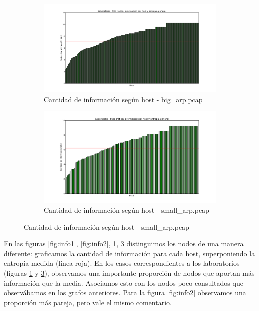 \begin{figure}[H]
        \begin{subfigure}[H]{0.5\textwidth}
                \centering
                \includegraphics[width=1\textwidth]{graficos/infoHost_laboBig.png}
                \caption{Cantidad de informaci\'on seg\'un host - big\_arp.pcap}
                \label{fig:info3}
        \end{subfigure}
        \begin{subfigure}[H]{0.5\textwidth}
                \centering
                \includegraphics[width=1\textwidth]{graficos/infoHost_laboSmall.png}
                \caption{Cantidad de informaci\'on seg\'un host - small\_arp.pcap}
                \label{fig:info4}
        \end{subfigure}
\end{figure}

En las figuras \ref{fig:info1}, \ref{fig:info2}, \ref{fig:info3}, \ref{fig:info4} distinguimos los nodos de una manera diferente:
graficamos la cantidad de información para cada host, superponiendo la entropía medida (l\'inea roja). En los casos correspondientes a los laboratorios (figuras \ref{fig:info3} y \ref{fig:info4}), observamos una importante proporción de nodos que aportan más información que la media. Asociamos esto con los nodos poco consultados que observábamos en los grafos anteriores. Para la figura \ref{fig:info2} observamos una proporción más pareja, pero vale el mismo comentario.\\

